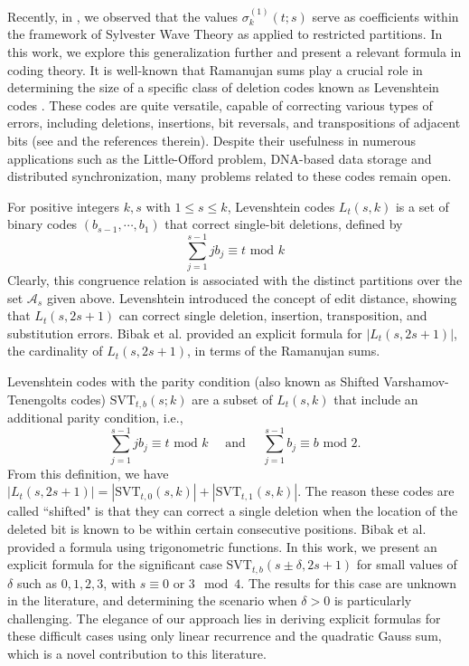 \documentclass[12pt]{article}
\begin{document}
Recently, in \cite{uk}, we observed that the values \(\sigma^{(1)}_{k}(t;s)\) serve as coefficients within the framework of Sylvester Wave Theory as applied to restricted partitions. In this work, we explore this generalization further and present a relevant formula in coding theory. It is well-known that Ramanujan sums play a crucial role in determining the size of a specific class of deletion codes known as Levenshtein codes \cite{bibak}. These codes are quite versatile, capable of correcting various types of errors, including deletions, insertions, bit reversals, and transpositions of adjacent bits (see \cite{bibak} and the references therein). Despite their usefulness in numerous applications such as the Little-Offord problem, DNA-based data storage and distributed synchronization, many problems related to these codes remain open. 

For positive integers $k,s$ with $1\leq s\leq k$, Levenshtein codes $L_{t}(s,k)$ is a set of binary codes $(b_{s-1},\cdots,b_{1})$ that correct single-bit deletions, defined by 
$$
\sum^{s-1}_{j=1} j b_{j} \equiv t \text{ mod } k
$$
Clearly, this congruence relation is associated with the distinct partitions over the set \(\mathcal{A}_{s}\) given above. Levenshtein introduced the concept of edit distance, showing that \(L_{t}(s, 2s + 1)\) can correct single deletion, insertion, transposition, and substitution errors. Bibak et al. \cite{bibak1} provided an explicit formula for \(|L_{t}(s, 2s + 1)|\), the cardinality of \(L_{t}(s, 2s + 1)\), in terms of the Ramanujan sums.

Levenshtein codes with the parity condition (also known as Shifted Varshamov-Tenengolts codes) $\text{SVT}_{t,b}(s;k)$ are a subset of $L_{t}(s,k)$ that include an additional parity condition, i.e., 
$$
\sum^{s-1}_{j=1} j b_{j} \equiv t \text{ mod } k \quad \text{ and } \quad \sum_{j=1}^{s-1} b_{j} \equiv b \text{ mod } 2.
$$
From this definition, we have $|L_{t}(s, 2s + 1)| = |\text{SVT}_{t,0}(s,k)| + |\text{SVT}_{t,1}(s,k)|$. The reason these codes are called ``shifted" is that they can correct a single deletion when the location of the deleted bit is known to be within certain consecutive positions. Bibak et al. \cite{bibak} provided a formula using trigonometric functions. In this work, we present an explicit formula for the significant case $\text{SVT}_{t,b}(s \pm \delta, 2s + 1)$ for small values of $\delta$ such as $0, 1, 2, 3$, with $s \equiv 0 \text{ or } 3 \mod 4$. The results for this case are unknown in the literature, and determining the scenario when $\delta > 0$ is particularly challenging. The elegance of our approach lies in deriving explicit formulas for these difficult cases using only linear recurrence and the quadratic Gauss sum, which is a novel contribution to this literature.
\end{document}
